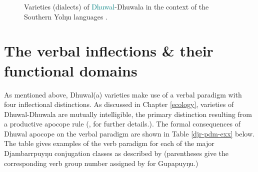 \begin{figure}[h]\centering
{}
\caption{Varieties (dialects) of \textcolor{teal}{Dhuwal}-\textcolor{ochre}{Dhuwala} in the context of the Southern Yolŋu languages \citep[following][13]{Wilkinson1991}.}\label{DDvars}
\end{figure}

\section{The verbal inflections \& their functional domains}\label{infls}

As mentioned above, Dhuwal(a) varieties make use of a verbal paradigm with four inflectional distinctions. As discussed in Chapter \ref{ecology}, varieties of Dhuwal-Dhuwala are mutually intelligible, the primary distinction resulting from a productive apocope rule (\citealp[51]{Morphy1977}, \citealp[see also][94\textit{ff}]{Wilkinson1991} for further details.). The formal consequences of Dhuwal apocope on the verbal paradigm are shown in Table \ref{djr-pdm-exx} below. The table gives examples of the verb paradigm for each of the major Djambarrpuyŋu conjugation classes as described by \citet[306ff]{Wilkinson1991} (parentheses give the corresponding verb group number assigned by \citet{Lowe1996} for Gupapuyŋu.)

